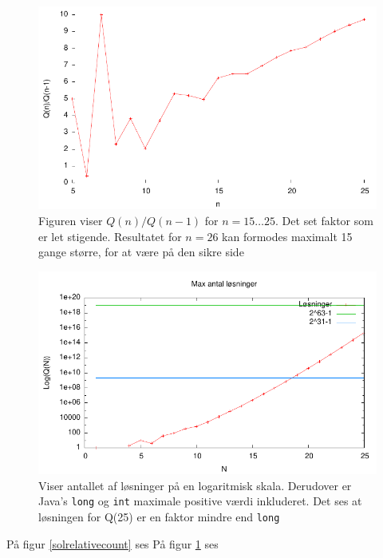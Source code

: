 \documentclass[draft,a4paper,11pt]{article}
\begin{document}
\begin{figure}[h!]
\begin{center}
\includegraphics{../benchmarks/resultatstorrelse.pdf}
\caption{Figuren viser $Q(n)/Q(n-1)$ for $n=15\ldots25$. Det set faktor som er let stigende. Resultatet for $n=26$ kan formodes maximalt 15 gange større, for at være på den sikre side}
\label{figur:loesningfaktor}
\end{center}
\end{figure}

\begin{figure}[h!]
\begin{center}
\includegraphics{../benchmarks/maxantal.pdf}
\caption{Viser antallet af løsninger på en logaritmisk skala. Derudover er Java's \texttt{long} og \texttt{int} maximale positive værdi inkluderet. Det ses at løsningen for Q(25) er en faktor mindre end \texttt{long}}
\label{figur:maxantal}
\end{center}
\end{figure}

På figur \ref{solrelativecount} ses
På figur \ref{figur:loesningfaktor} ses
\end{document}
